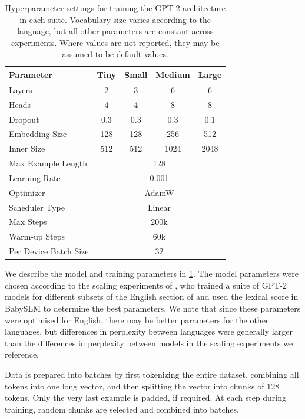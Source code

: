 \begin{table}[!ht]
    \centering
    \small
    \begin{tabular}{lcccc}
    \toprule
         Parameter & Tiny & Small & Medium & Large \\
    \midrule
         Layers & 2 & 3 & 6 & 6\\
         Heads & 4 & 4 & 8 & 8 \\
         Dropout & 0.3 & 0.3 & 0.3 & 0.1 \\
         Embedding Size & 128 & 128 & 256 & 512 \\
         Inner Size & 512 & 512 & 1024 & 2048 \\
         \midrule
         Max Example Length & \multicolumn{4}{c}{128} \\
         Learning Rate & \multicolumn{4}{c}{0.001}\\
         Optimizer & \multicolumn{4}{c}{AdamW} \\
         Scheduler Type & \multicolumn{4}{c}{Linear}\\
         Max Steps & \multicolumn{4}{c}{200k} \\
         Warm-up Steps & \multicolumn{4}{c}{60k} \\
         Per Device Batch Size & \multicolumn{4}{c}{32} \\
    \bottomrule
    \end{tabular}
    \caption{Hyperparameter settings for training the GPT-2 architecture in each suite. Vocabulary size varies according to the language, but all other parameters are constant across experiments. Where values are not reported, they may be assumed to be default values.}
    \label{tab:15-baseline_hyperparams}
\end{table}

We describe the model and training parameters in \cref{tab:15-baseline_hyperparams}. The model parameters were chosen according to the scaling experiments of \citet{goriely2025}, who trained a suite of GPT-2 models for different subsets of the English section of \ipachildes and used the lexical score in BabySLM \citep{lavechin} to determine the best parameters. We note that since these parameters were optimised for English, there may be better parameters for the other languages, but differences in perplexity between languages were generally larger than the differences in perplexity between models in the scaling experiments we reference.

Data is prepared into batches by first tokenizing the entire dataset, combining all tokens into one long vector, and then splitting the vector into chunks of 128 tokens. Only the very last example is padded, if required. At each step during training, random chunks are selected and combined into batches. 

